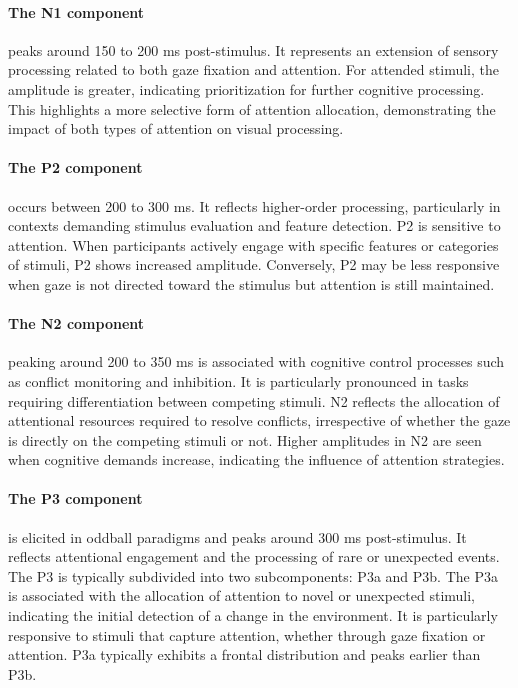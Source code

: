 \paragraph{The N1 component} peaks around 150 to 200 ms post-stimulus.
It represents an extension of sensory processing related to both gaze fixation and
attention.
For attended stimuli, the amplitude is greater, indicating prioritization for further
cognitive processing.
This highlights a more selective form of attention allocation, demonstrating the impact
of both types of attention on visual processing.

\paragraph{The P2 component} occurs between 200 to 300 ms.
It reflects higher-order processing, particularly in contexts demanding stimulus
evaluation and feature detection.
P2 is sensitive to attention.
When participants actively engage with specific features or categories of stimuli, P2
shows increased amplitude.
Conversely, P2 may be less responsive when gaze is not directed toward the stimulus but
attention is still maintained.

\paragraph{The N2 component} peaking around 200 to 350 ms is associated with cognitive
control processes such as conflict monitoring and inhibition.
It is particularly pronounced in tasks requiring differentiation between competing
stimuli.
N2 reflects the allocation of attentional resources required to resolve conflicts,
irrespective of whether the gaze is directly on the competing stimuli or not.
Higher amplitudes in N2 are seen when cognitive demands increase, indicating the
influence of attention strategies.

\paragraph{The P3 component} is elicited in oddball paradigms and peaks around 300 ms
post-stimulus.
It reflects attentional engagement and the processing of rare or unexpected events.
The P3 is typically subdivided into two subcomponents: P3a and P3b.
The P3a is associated with the allocation of attention to novel or unexpected stimuli,
indicating the initial detection of a change in the environment.
It is particularly responsive to stimuli that capture attention, whether through gaze
fixation or attention.
P3a typically exhibits a frontal distribution and peaks earlier than P3b.

